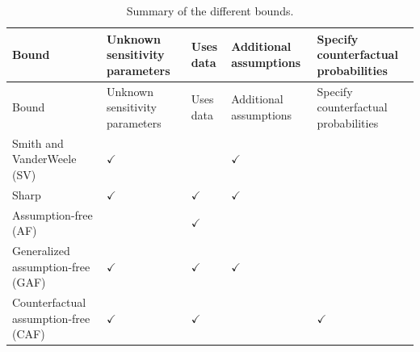 \begin{longtable}[]{@{}
  >{\centering\arraybackslash}p{}
  >{\centering\arraybackslash}p{}
  >{\centering\arraybackslash}p{}
  >{\centering\arraybackslash}p{}
  >{\centering\arraybackslash}p{}@{}}
\caption{\label{tab:bounds} Summary of the different bounds.}\tabularnewline
\toprule\noalign{}
\begin{minipage}[b]{\linewidth}\centering
Bound
\end{minipage} & \begin{minipage}[b]{\linewidth}\centering
Unknown sensitivity parameters
\end{minipage} & \begin{minipage}[b]{\linewidth}\centering
Uses data
\end{minipage} & \begin{minipage}[b]{\linewidth}\centering
Additional assumptions
\end{minipage} & \begin{minipage}[b]{\linewidth}\centering
Specify counterfactual probabilities
\end{minipage} \\
\midrule\noalign{}
\endfirsthead
\toprule\noalign{}
\begin{minipage}[b]{\linewidth}\centering
Bound
\end{minipage} & \begin{minipage}[b]{\linewidth}\centering
Unknown sensitivity parameters
\end{minipage} & \begin{minipage}[b]{\linewidth}\centering
Uses data
\end{minipage} & \begin{minipage}[b]{\linewidth}\centering
Additional assumptions
\end{minipage} & \begin{minipage}[b]{\linewidth}\centering
Specify counterfactual probabilities
\end{minipage} \\
\midrule\noalign{}
\endhead
\bottomrule\noalign{}
\endlastfoot
Smith and VanderWeele (SV) & \(\checkmark\) & & \(\checkmark\) & \\
Sharp & \(\checkmark\) & \(\checkmark\) & \(\checkmark\) & \\
Assumption-free (AF) & & \(\checkmark\) & & \\
Generalized assumption-free (GAF) & \(\checkmark\) & \(\checkmark\) & \(\checkmark\) & \\
Counterfactual assumption-free (CAF) & \(\checkmark\) & \(\checkmark\) & & \(\checkmark\) \\
\end{longtable}

